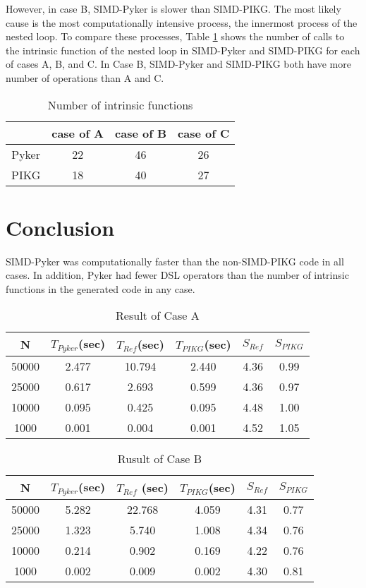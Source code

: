 \documentclass[ams]{article}
\begin{document}
 
 However, in case B, SIMD-Pyker is slower than SIMD-PIKG. The most likely cause is the most computationally intensive process, the innermost process of the nested loop. To compare these processes, Table \ref{tb:table} shows the number of calls to the intrinsic function of the nested loop in SIMD-Pyker and SIMD-PIKG for each of cases A, B, and C. In Case B, SIMD-Pyker and SIMD-PIKG both have more number of operations than A and C.
		\begin{table}[htb]
				\caption{Number of intrinsic functions}
				\label{tb:table}
				\begin{tabular}{|c||c|c|c|} \hline
				  & case of A & case of B & case of C \\ \hline \hline
				Pyker & 22 & 46 & 26 \\ \hline
			PIKG	& 18 & 40 & 27  \\ \hline
				\end{tabular}

			\end{table}

\section{Conclusion}
SIMD-Pyker was computationally faster than the non-SIMD-PIKG code in all cases.
In addition, Pyker had fewer DSL operators than the number of intrinsic functions in the generated code in any case.

    \begin{table}[bht]
            \centering

            \caption{Result of Case A}
            \label{tb:resultA}
                \begin{tabular}{|c||c|c|c|c|c|} \hline
N &$T_{Pyker}$(sec)&$T_{Ref}$(sec)&$T_{PIKG}$(sec)&$S_{Ref}$&$S_{PIKG}$\\ \hline\hline
50000 &2.477  &10.794& 2.440& 4.36 & 0.99 \\ \hline
25000 & 0.617  &2.693& 0.599& 4.36 & 0.97 \\ \hline
10000 &0.095   &0.425& 0.095& 4.48 & 1.00 \\ \hline
 1000 &0.001   &0.004& 0.001& 4.52 & 1.05 \\ \hline

                \end{tabular}\hfill
    \end{table}
    \begin{table}[htb]
                \centering
				\caption{Rusult of Case B}
				\label{tb:resultB}
				\begin{tabular}{|c||c|c|c|c|c|} \hline
N & $T_{Pyker}$(sec) & $T_{Ref}$ (sec) & $T_{PIKG}$(sec) &$S_{Ref}$ & $S_{PIKG}$ \\ \hline\hline
50000 & 5.282&22.768 &4.059 & 4.31&0.77\\ \hline
25000 & 1.323& 5.740&1.008 & 4.34&0.76\\  \hline
10000 & 0.214&0.902 &0.169 & 4.22&0.76 \\ \hline
1000  &0.002&0.009 & 0.002 & 4.30&0.81\\  \hline
				\end{tabular}
        \end{table}
    
\end{document}
